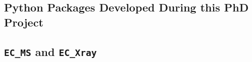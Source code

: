 
\begin{appendices}
	
	
	
	\chapter{Python Packages Developed During this PhD Project}
		\section{\texttt{EC\_MS} and \texttt{EC\_Xray}}
\end{appendices}